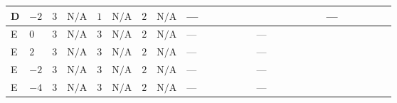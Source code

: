 \documentclass[8pt]{article}
\begin{document}
\begin{landscape}
\begin{longtable}{@{}llcccccc >{\raggedright\arraybackslash}p{0.21\linewidth} >{\raggedright\arraybackslash}p{0.21\linewidth} >{\raggedright\arraybackslash}p{0.21\linewidth}@{}}
\midrule
D & $-2$ & $3$ & $\text{N/A}$ & $1$ & $\text{N/A}$ & $2$ & $\text{N/A}$ & --- & \scriptsize\adjustbox{max width=\linewidth}{$\begin{gathered} {\lambda_5} (6 \operatorname{Tr}\!\left({Y_d}\,\left({Y_d}\right)^{\dagger}\right)+2 \operatorname{Tr}\!\left({Y_e}\,\left({Y_e}\right)^{\dagger}\right)+6 \operatorname{Tr}\!\left({Y_u}\,\left({Y_u}\right)^{\dagger}\right)-4 {\lambda_{HS_1}^{(A)}})\end{gathered}$} & --- \\
\midrule
E & $0$ & $3$ & $\text{N/A}$ & $3$ & $\text{N/A}$ & $2$ & $\text{N/A}$ & --- & --- & \scriptsize\adjustbox{max width=\linewidth}{$\begin{gathered} {\lambda_5} \left(6 \operatorname{Tr}\!\left({Y_d}\,\left({Y_d}\right)^{\dagger}\right)+2 \operatorname{Tr}\!\left({Y_e}\,\left({Y_e}\right)^{\dagger}\right)+6 \operatorname{Tr}\!\left({Y_u}\,\left({Y_u}\right)^{\dagger}\right)-\frac{4 {\lambda_{12}^{(A)}}}{3}-2 {\lambda_{12}^{(\times)}}-2 {\lambda_{HS_1}^{(A)}}-\frac{4 {\lambda_{HS_2}^{(A)}}}{3}\right)\end{gathered}$} \\
\midrule
E & $2$ & $3$ & $\text{N/A}$ & $3$ & $\text{N/A}$ & $2$ & $\text{N/A}$ & --- & --- & \scriptsize\adjustbox{max width=\linewidth}{$\begin{gathered} {\lambda_5} \left(6 \operatorname{Tr}\!\left({Y_d}\,\left({Y_d}\right)^{\dagger}\right)+2 \operatorname{Tr}\!\left({Y_e}\,\left({Y_e}\right)^{\dagger}\right)+6 \operatorname{Tr}\!\left({Y_u}\,\left({Y_u}\right)^{\dagger}\right)-\frac{4 {\lambda_{12}^{(A)}}}{3}-2 {\lambda_{12}^{(\times)}}-2 {\lambda_{HS_1}^{(A)}}-\frac{4 {\lambda_{HS_2}^{(A)}}}{3}\right)\end{gathered}$} \\
\midrule
E & $-2$ & $3$ & $\text{N/A}$ & $3$ & $\text{N/A}$ & $2$ & $\text{N/A}$ & --- & --- & \scriptsize\adjustbox{max width=\linewidth}{$\begin{gathered} {\lambda_5} \left(6 \operatorname{Tr}\!\left({Y_d}\,\left({Y_d}\right)^{\dagger}\right)+2 \operatorname{Tr}\!\left({Y_e}\,\left({Y_e}\right)^{\dagger}\right)+6 \operatorname{Tr}\!\left({Y_u}\,\left({Y_u}\right)^{\dagger}\right)-\frac{4 {\lambda_{12}^{(A)}}}{3}-2 {\lambda_{12}^{(\times)}}-2 {\lambda_{HS_1}^{(A)}}-\frac{4 {\lambda_{HS_2}^{(A)}}}{3}\right)\end{gathered}$} \\
\midrule
E & $-4$ & $3$ & $\text{N/A}$ & $3$ & $\text{N/A}$ & $2$ & $\text{N/A}$ & --- & --- & \scriptsize\adjustbox{max width=\linewidth}{$\begin{gathered} {\lambda_5} \left(6 \operatorname{Tr}\!\left({Y_d}\,\left({Y_d}\right)^{\dagger}\right)+2 \operatorname{Tr}\!\left({Y_e}\,\left({Y_e}\right)^{\dagger}\right)+6 \operatorname{Tr}\!\left({Y_u}\,\left({Y_u}\right)^{\dagger}\right)-\frac{4 {\lambda_{12}^{(A)}}}{3}-2 {\lambda_{12}^{(\times)}}-2 {\lambda_{HS_1}^{(A)}}-\frac{4 {\lambda_{HS_2}^{(A)}}}{3}\right)\end{gathered}$} \\

\end{longtable}
\end{landscape}
\end{document}
